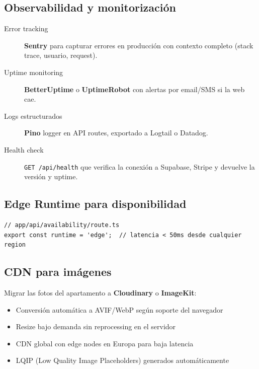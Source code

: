 \documentclass[12pt,a4paper,twoside,openright]{report}
\begin{document}
\subsection{Observabilidad y monitorización}

\begin{description}
  \item[Error tracking] \textbf{Sentry} para capturar errores en producción con
    contexto completo (stack trace, usuario, request).

  \item[Uptime monitoring] \textbf{BetterUptime} o \textbf{UptimeRobot} con
    alertas por email/SMS si la web cae.

  \item[Logs estructurados] \textbf{Pino} logger en API routes, exportado a
    Logtail o Datadog.

  \item[Health check] \texttt{GET /api/health} que verifica la conexión a
    Supabase, Stripe y devuelve la versión y uptime.
\end{description}

\subsection{Edge Runtime para disponibilidad}

\begin{lstlisting}[style=tsStyle]
// app/api/availability/route.ts
export const runtime = 'edge';  // latencia < 50ms desde cualquier region
\end{lstlisting}

\subsection{CDN para imágenes}

Migrar las fotos del apartamento a \textbf{Cloudinary} o \textbf{ImageKit}:
\begin{itemize}
  \item Conversión automática a AVIF/WebP según soporte del navegador
  \item Resize bajo demanda sin reprocessing en el servidor
  \item CDN global con edge nodes en Europa para baja latencia
  \item LQIP (Low Quality Image Placeholders) generados automáticamente
\end{itemize}

\end{document}
